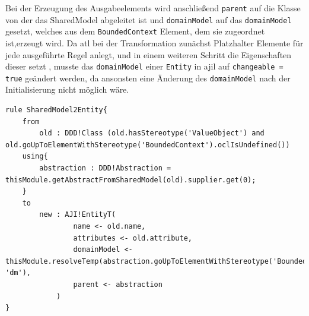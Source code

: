 \documentclass[
	oneside,  %
	ngerman, 
	final, 
	11pt, 
	a4paper, 
	1.1headlines, 
	headinclude=false, 
	footinclude=false, 
	mpinclude=false, 
	pagesize, 
	onecolumn, 
	titlepage, 
	parskip=half, 
	headsepline, 
	chapterprefix=false, 
	version=first, 
	listof=totoc, 
	bibliography=totoc, 
	toc=graduated, 
	fleqn
]{scrbook}
\begin{document}
Bei der Erzeugung des Ausgabeelements wird anschließend \texttt{parent} auf die Klasse von der das SharedModel abgeleitet ist und \texttt{domainModel} auf das \texttt{domainModel} gesetzt, welches aus dem \texttt{BoundedContext} Element, dem sie zugeordnet ist,erzeugt wird. Da \ac{atl} bei der Transformation zunächst Platzhalter Elemente für jede ausgeführte Regel anlegt, und in einem weiteren Schritt die Eigenschaften dieser setzt \cite{ATLDoc}, musste das \texttt{domainModel} einer \texttt{Entity} in \ac{ajil} auf \texttt{changeable = true} geändert werden, da ansonsten eine Änderung des \texttt{domainModel} nach der Initialisierung nicht möglich wäre.
\begin{lstlisting}[caption={Regel zur Erzeugung einer Entity aus einem Shared Model},captionpos=b,label=Quellcode:SharedModel2Entity] 
rule SharedModel2Entity{
	from
		old : DDD!Class (old.hasStereotype('ValueObject') and old.goUpToElementWithStereotype('BoundedContext').oclIsUndefined())
	using{
		abstraction : DDD!Abstraction = thisModule.getAbstractFromSharedModel(old).supplier.get(0);
	}	
	to
		new : AJI!EntityT(
				name <- old.name,
				attributes <- old.attribute,
				domainModel <- thisModule.resolveTemp(abstraction.goUpToElementWithStereotype('BoundedContext'), 'dm'),
				parent <- abstraction
			)
}
\end{lstlisting}
\end{document}
